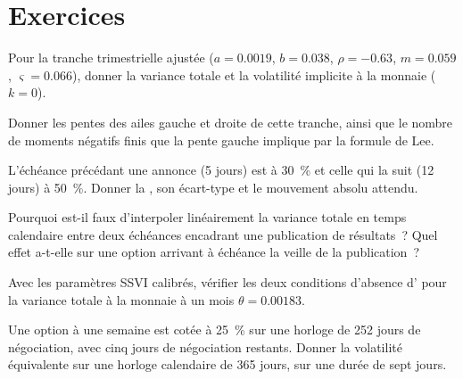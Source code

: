 \section{Exercices}

\begin{exercise}[$\star$]\label{exo:dv:parametrising-the-surface:1}
Pour la tranche trimestrielle ajustée ($a=0.0019$, $b=0.038$, $\rho=-0.63$, $m=0.059$, $\varsigma=0.066$),
donner la variance totale et la volatilité implicite à la monnaie ($k=0$).
\end{exercise}

\begin{exercise}[$\star$]\label{exo:dv:parametrising-the-surface:2}
Donner les pentes des ailes gauche et droite de cette tranche, ainsi que le nombre de moments négatifs finis que
la pente gauche implique par la formule de Lee.
\end{exercise}

\begin{exercise}[$\star$]\label{exo:dv:parametrising-the-surface:3}
L'échéance précédant une annonce (5 jours) est à 30~\% et celle qui la suit (12 jours) à 50~\%. Donner la , son écart-type et le mouvement absolu attendu.
\end{exercise}

\begin{exercise}[$\star\star$]\label{exo:dv:parametrising-the-surface:4}
Pourquoi est-il faux d'interpoler linéairement la variance totale en temps calendaire entre deux échéances encadrant
une publication de résultats~? Quel effet a-t-elle sur une option arrivant à échéance la veille de la publication~?
\end{exercise}

\begin{exercise}[$\star\star$]\label{exo:dv:parametrising-the-surface:5}
Avec les paramètres SSVI calibrés, vérifier les deux conditions d'absence d' pour la variance
totale à la monnaie à un mois $\theta=0.00183$.
\end{exercise}

\begin{exercise}[$\star\star$]\label{exo:dv:parametrising-the-surface:6}
Une option à une semaine est cotée à 25~\% sur une horloge de 252 jours de négociation, avec cinq jours de
négociation restants. Donner la volatilité équivalente sur une horloge calendaire de 365 jours, sur une durée de sept jours.
\end{exercise}

